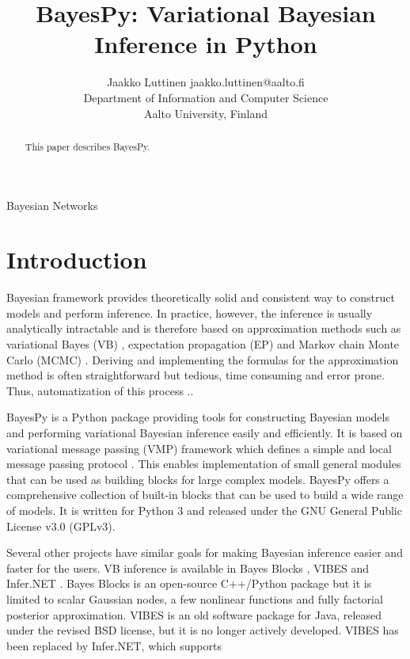 \documentclass[twoside,11pt]{article}
\begin{document}
\title{BayesPy: Variational Bayesian Inference in Python}

\author{\name Jaakko Luttinen \email jaakko.luttinen@aalto.fi \\
       \addr Department of Information and Computer Science\\
       Aalto University, Finland}


\maketitle

\begin{abstract}%
  This paper describes BayesPy.
\end{abstract}

\begin{keywords}
  Bayesian Networks
\end{keywords}

\section{Introduction}

Bayesian framework provides theoretically solid and consistent way to construct
models and perform inference.  In practice, however, the inference is usually
analytically intractable and is therefore based on approximation methods such as
variational Bayes (VB) \cite{?}, expectation propagation (EP) \cite{?} and
Markov chain Monte Carlo (MCMC) \cite{?}.  Deriving and implementing the
formulas for the approximation method is often straightforward but tedious, time
consuming and error prone.  Thus, automatization of this process ..


BayesPy is a Python package providing tools for constructing Bayesian models and
performing variational Bayesian inference easily and efficiently.  It is based
on variational message passing (VMP) framework which defines a simple and local
message passing protocol \cite{?}.  This enables implementation of small general
modules that can be used as building blocks for large complex models.  BayesPy
offers a comprehensive collection of built-in blocks that can be used to build a
wide range of models.  It is written for Python 3 and released under the GNU
General Public License v3.0 (GPLv3).


Several other projects have similar goals for making Bayesian inference easier
and faster for the users.  VB inference is available in Bayes Blocks \cite{?},
VIBES \cite{?} and Infer.NET \cite{?}.  Bayes Blocks is an open-source
C++/Python package but it is limited to scalar Gaussian nodes, a few nonlinear
functions and fully factorial posterior approximation.  VIBES is an old software
package for Java, released under the revised BSD license, but it is no longer
actively developed.  VIBES has been replaced by Infer.NET, which supports
\end{document}
